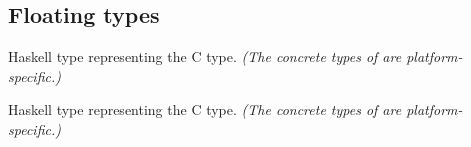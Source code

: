 \subsection{Floating types}
\begin{haddockdesc}
\item[\begin{tabular}{@{}l}
data CFloat
\end{tabular}]
{\haddockbegindoc
Haskell type representing the C  type.
 \emph{(The concrete types of  are platform-specific.)}\par}
\end{haddockdesc}
\begin{haddockdesc}
\item[\begin{tabular}{@{}l}
instance Enum CFloat\\instance Floating CFloat\\instance RealFloat CFloat\\instance Storable CFloat\\instance Num CFloat\\instance Read CFloat\\instance Fractional CFloat\\instance Real CFloat\\instance RealFrac CFloat\\instance Show CFloat\\instance Eq CFloat\\instance Ord CFloat
\end{tabular}]
\end{haddockdesc}
\begin{haddockdesc}
\item[\begin{tabular}{@{}l}
data CDouble
\end{tabular}]
{\haddockbegindoc
Haskell type representing the C  type.
 \emph{(The concrete types of  are platform-specific.)}\par}
\end{haddockdesc}
\begin{haddockdesc}
\item[\begin{tabular}{@{}l}
instance Enum CDouble\\instance Floating CDouble\\instance RealFloat CDouble\\instance Storable CDouble\\instance Num CDouble\\instance Read CDouble\\instance Fractional CDouble\\instance Real CDouble\\instance RealFrac CDouble\\instance Show CDouble\\instance Eq CDouble\\instance Ord CDouble
\end{tabular}]
\end{haddockdesc}
